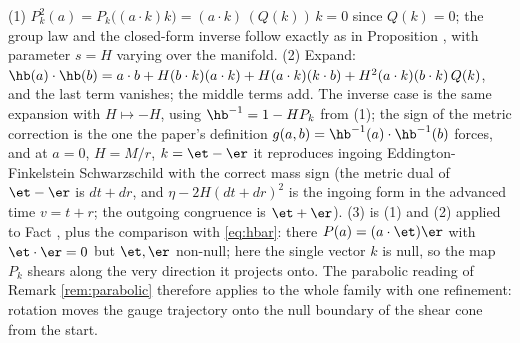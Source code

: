 (1) $P_k^2(a) = P_k\bigl((a\cdot k)k\bigr) = (a\cdot k)\,(Q(k))\,k = 0$ since $Q(k) = 0$; the group law and the closed-form inverse follow exactly as in Proposition , with parameter $s = H$ varying over the manifold. (2) Expand: $\hb(a)\cdot\hb(b) = a\cdot b + H(b\cdot k)(a\cdot k) + H(a\cdot k)(k\cdot b) + H^2 (a\cdot k)(b\cdot k)\,Q(k)$, and the last term vanishes; the middle terms add. The inverse case is the same expansion with $H \mapsto -H$, using $\hb^{-1} = 1 - HP_k$ from (1); the sign of the metric correction is the one the paper's definition $g(a,b) = \hb^{-1}(a)\cdot\hb^{-1}(b)$ forces, and at $a = 0$, $H = M/r$, $k = \et - \er$ it reproduces ingoing Eddington-Finkelstein Schwarzschild with the correct mass sign (the metric dual of $\et - \er$ is $dt + dr$, and $\eta - 2H(dt + dr)^2$ is the ingoing form in the advanced time $v = t + r$; the outgoing congruence is $\et + \er$). (3) is (1) and (2) applied to Fact , plus the comparison with \eqref{eq:hbar}: there $P(a) = (a\cdot\et)\er$ with $\et\cdot\er = 0$ but $\et, \er$ non-null; here the single vector $k$ is null, so the map $P_k$ shears along the very direction it projects onto. The parabolic reading of Remark \ref{rem:parabolic} therefore applies to the whole family with one refinement: rotation moves the gauge trajectory onto the null boundary of the shear cone from the start.
